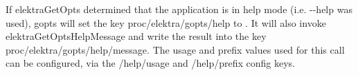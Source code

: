 If {\ttfamily elektra\+Get\+Opts} determined that the application is in help mode (i.\+e. {\ttfamily -\/-\/help} was used), {\ttfamily gopts} will set the key {\ttfamily proc/elektra/gopts/help} to {}. It will also invoke {\ttfamily elektra\+Get\+Opts\+Help\+Message} and write the result into the key {\ttfamily proc/elektra/gopts/help/message}. The {\ttfamily usage} and {\ttfamily prefix} values used for this call can be configured, via the {\ttfamily /help/usage} and {\ttfamily /help/prefix} config keys. 